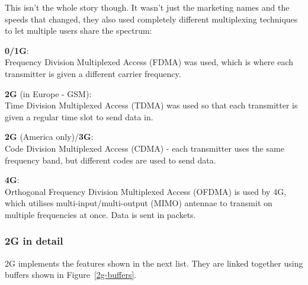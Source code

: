 This isn't the whole story though. It wasn't just the marketing names and the
speeds that changed, they also used completely different multiplexing techniques
to let multiple users share the spectrum:


\begin{description}
  \item \textbf{0/1G}:\\
    Frequency Division Multiplexed Access (FDMA) was used, which is where
    each transmitter is given a different carrier frequency.
  \item \textbf{2G} (in Europe - GSM):\\
    Time Division Multiplexed Access (TDMA) was used so that each transmitter
    is given a regular time slot to send data in.
  \item \textbf{2G} (America only)/\textbf{3G}:\\
    Code Division Multiplexed Access (CDMA) - each transmitter uses the same
    frequency band, but different codes are used to send data.
  \item \textbf{4G}:\\
    Orthogonal Frequency Division Multiplexed Access (OFDMA) is used by 4G,
    which utilises multi-input/multi-output (MIMO) antennae to transmit on
    multiple frequencies at once. Data is sent in packets.
\end{description}

\subsubsection{2G in detail}

2G implements the features shown in the next list. They are linked together
using buffers shown in Figure~\ref{2g-buffers}.

